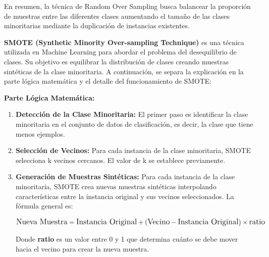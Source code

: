 En resumen, la técnica de Random Over Sampling busca balancear la proporción de muestras entre las diferentes clases aumentando el tamaño de las clases minoritarias mediante la duplicación de instancias existentes.


\textbf{SMOTE (Synthetic Minority Over-sampling Technique)} es una técnica utilizada en Machine Learning para abordar el problema del desequilibrio de clases. Su objetivo es equilibrar la distribución de clases creando muestras sintéticas de la clase minoritaria. A continuación, se separa la explicación en la parte lógica matemática y el detalle del funcionamiento de SMOTE:



\textbf{Parte Lógica Matemática:}
\begin{enumerate}
\item \textbf{Detección de la Clase Minoritaria:} El primer paso es identificar la clase minoritaria en el conjunto de datos de clasificación, es decir, la clase que tiene menos ejemplos.
\item \textbf{Selección de Vecinos:} Para cada instancia de la clase minoritaria, SMOTE selecciona k vecinos cercanos. El valor de k se establece previamente.
\item \textbf{Generación de Muestras Sintéticas:} Para cada instancia de la clase minoritaria, SMOTE crea nuevas muestras sintéticas interpolando características entre la instancia original y sus vecinos seleccionados. La fórmula general es:


\begin{equation}
\fontsize{12}{9}\selectfont
\text{Nueva Muestra} = \text{Instancia Original} + (\text{Vecino} - \text{Instancia Original}) \times \text{ratio}
	\label{eq:smote}
\end{equation}

   Donde \textbf{ratio} es un valor entre 0 y 1 que determina cuánto se debe mover hacia el vecino para crear la nueva muestra.
\end{enumerate}

